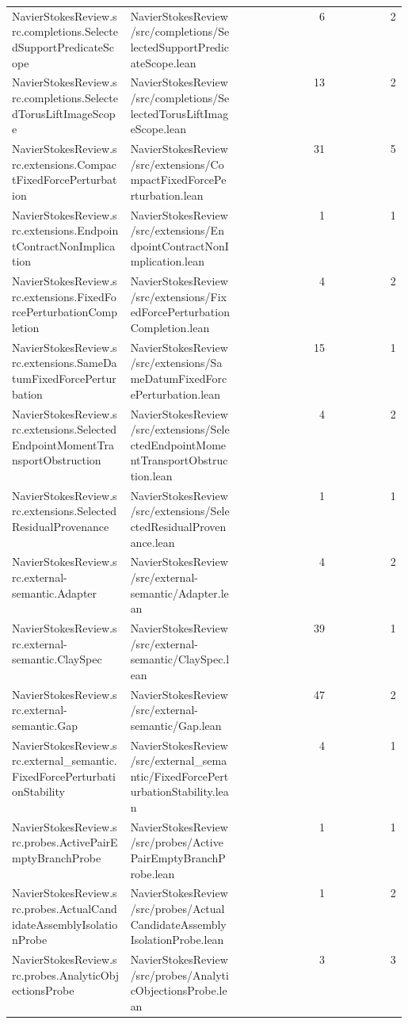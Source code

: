 \begin{longtable}{p{0.30\linewidth}p{0.28\linewidth}rr}
NavierStokesReview.src.completions.SelectedSupportPredicateScope & NavierStokesReview/src/completions/SelectedSupportPredicateScope.lean & 6 & 2\\
NavierStokesReview.src.completions.SelectedTorusLiftImageScope & NavierStokesReview/src/completions/SelectedTorusLiftImageScope.lean & 13 & 2\\
NavierStokesReview.src.extensions.CompactFixedForcePerturbation & NavierStokesReview/src/extensions/CompactFixedForcePerturbation.lean & 31 & 5\\
NavierStokesReview.src.extensions.EndpointContractNonImplication & NavierStokesReview/src/extensions/EndpointContractNonImplication.lean & 1 & 1\\
NavierStokesReview.src.extensions.FixedForcePerturbationCompletion & NavierStokesReview/src/extensions/FixedForcePerturbationCompletion.lean & 4 & 2\\
NavierStokesReview.src.extensions.SameDatumFixedForcePerturbation & NavierStokesReview/src/extensions/SameDatumFixedForcePerturbation.lean & 15 & 1\\
NavierStokesReview.src.extensions.SelectedEndpointMomentTransportObstruction & NavierStokesReview/src/extensions/SelectedEndpointMomentTransportObstruction.lean & 4 & 2\\
NavierStokesReview.src.extensions.SelectedResidualProvenance & NavierStokesReview/src/extensions/SelectedResidualProvenance.lean & 1 & 1\\
NavierStokesReview.src.external-semantic.Adapter & NavierStokesReview/src/external-semantic/Adapter.lean & 4 & 2\\
NavierStokesReview.src.external-semantic.ClaySpec & NavierStokesReview/src/external-semantic/ClaySpec.lean & 39 & 1\\
NavierStokesReview.src.external-semantic.Gap & NavierStokesReview/src/external-semantic/Gap.lean & 47 & 2\\
NavierStokesReview.src.external\_semantic.FixedForcePerturbationStability & NavierStokesReview/src/external\_semantic/FixedForcePerturbationStability.lean & 4 & 1\\
NavierStokesReview.src.probes.ActivePairEmptyBranchProbe & NavierStokesReview/src/probes/ActivePairEmptyBranchProbe.lean & 1 & 1\\
NavierStokesReview.src.probes.ActualCandidateAssemblyIsolationProbe & NavierStokesReview/src/probes/ActualCandidateAssemblyIsolationProbe.lean & 1 & 2\\
NavierStokesReview.src.probes.AnalyticObjectionsProbe & NavierStokesReview/src/probes/AnalyticObjectionsProbe.lean & 3 & 3\\

\end{longtable}
